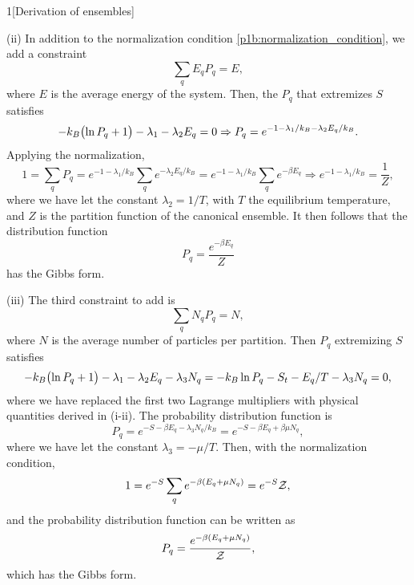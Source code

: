 \documentclass[12pt]{article}
\begin{document}
\begin{problem}{1}[Derivation of ensembles]
\begin{solution}
\qquad(ii) In addition to the normalization condition
\eqref{p1b:normalization_condition}, we add a constraint
\begin{equation}
    \sum_qE_qP_q=E, 
\end{equation}
where $E$ is the average energy of the system. Then, the $P_q$ that extremizes
$S$ satisfies
\begin{equation}
    -k_B\qty(\ln P_q+1)-\lambda_1-\lambda_2E_q=0
    \Rightarrow P_q=e^{-1-\lambda_1/k_B-\lambda_2E_q/k_B}.
\end{equation}
Applying the normalization,
\begin{equation}
    1=\sum_qP_q=e^{-1-\lambda_1/k_B}\sum_qe^{-\lambda_2E_q/k_B}
    = e^{-1-\lambda_1/k_B}\sum_qe^{-\beta E_q}
    \Rightarrow e^{-1-\lambda_1/k_B}=\frac1{Z},
\end{equation}
where we have let the constant $\lambda_2=1/T$, with $T$ the equilibrium
temperature, and $Z$ is the partition function of the canonical ensemble. It
then follows that the distribution function
\begin{equation}
    P_q=\frac{e^{-\beta E_q}}{Z} 
\end{equation}
has the Gibbs form.

(iii) The third constraint to add is
\begin{equation}
    \sum_qN_qP_q=N,
\end{equation}
where $N$ is the average number of particles per partition. Then $P_q$
extremizing $S$ satisfies
\begin{equation}
    -k_B\qty(\ln P_q+1)-\lambda_1-\lambda_2E_q-\lambda_3N_q
    =-k_B\ln P_q-S_t-E_q/T-\lambda_3 N_q=0,
\end{equation}
where we have replaced the first two Lagrange multipliers with physical
quantities derived in (i-ii). The probability distribution function is
\begin{equation}
    P_q=e^{-S-\beta E_q-\lambda_3N_q/k_B}=e^{-S-\beta E_q+\beta\mu N_q},
\end{equation}
where we have let the constant $\lambda_3=-\mu/T$. Then, with the normalization
condition,
\begin{equation}
    1=e^{-S}\sum_qe^{-\beta(E_q+\mu N_q)}=e^{-S}\mathcal{Z}, 
\end{equation}
and the probability distribution function can be written as
\begin{equation}
    P_q=\frac{e^{-\beta(E_q+\mu N_q)}}{\mathcal{Z}}, 
\end{equation}
which has the Gibbs form.
\end{solution}


\end{problem}
\end{document}
